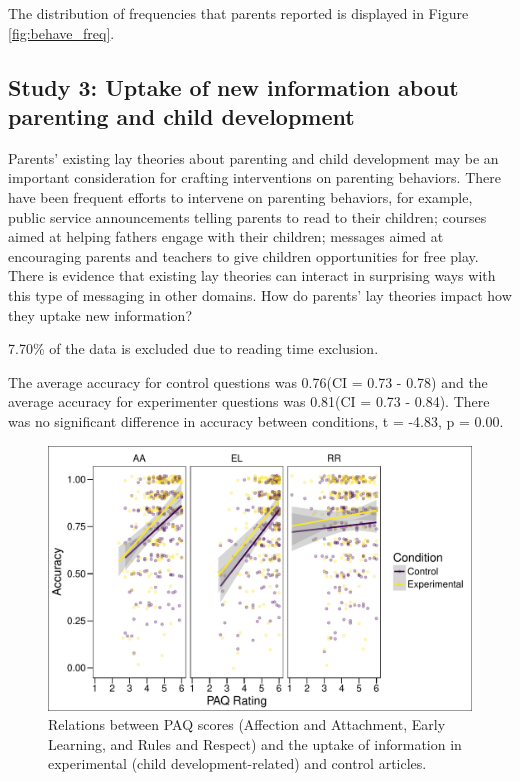 \documentclass[man]{apa6}
\theoremstyle{definition}
\theoremstyle{definition}
\theoremstyle{definition}
\theoremstyle{remark}
\begin{document}
The distribution of frequencies that parents reported is displayed in
Figure \ref{fig:behave_freq}.

\subsection{Study 3: Uptake of new information about parenting and child
development}\label{study-3-uptake-of-new-information-about-parenting-and-child-development}

Parents' existing lay theories about parenting and child development may
be an important consideration for crafting interventions on parenting
behaviors. There have been frequent efforts to intervene on parenting
behaviors, for example, public service announcements telling parents to
read to their children; courses aimed at helping fathers engage with
their children; messages aimed at encouraging parents and teachers to
give children opportunities for free play. There is evidence that
existing lay theories can interact in surprising ways with this type of
messaging in other domains. How do parents' lay theories impact how they
uptake new information?

7.70\% of the data is excluded due to reading time exclusion.

The average accuracy for control questions was 0.76(CI = 0.73 - 0.78)
and the average accuracy for experimenter questions was 0.81(CI = 0.73 -
0.84). There was no significant difference in accuracy between
conditions, t = -4.83, p = 0.00.

\begin{figure}
\centering
\includegraphics{PAQ_paper_files/figure-latex/uptake-1.pdf}
\caption{\label{fig:uptake}Relations between PAQ scores (Affection and
Attachment, Early Learning, and Rules and Respect) and the uptake of
information in experimental (child development-related) and control
articles.}
\end{figure}
\end{document}
